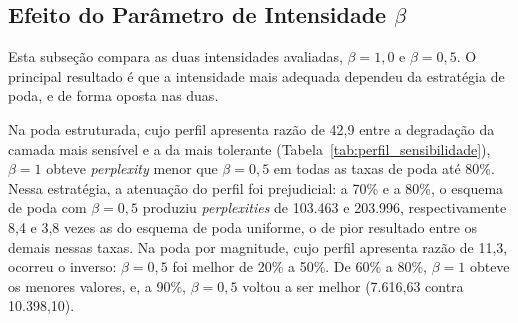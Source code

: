 \subsection{Efeito do Parâmetro de Intensidade $\beta$}\label{subsec:ablacao_beta}

Esta subseção compara as duas intensidades avaliadas, $\beta = 1{,}0$ e $\beta = 0{,}5$.
O principal resultado é que a intensidade mais adequada dependeu da
estratégia de poda, e de forma oposta nas duas.

Na poda estruturada, cujo perfil apresenta razão de 42,9 entre a degradação da camada mais
sensível e a da mais tolerante (Tabela~\ref{tab:perfil_sensibilidade}), $\beta = 1$ obteve
\textit{perplexity} menor que $\beta = 0{,}5$ em todas as taxas de poda até 80\%. Nessa
estratégia, a atenuação do perfil foi prejudicial: a 70\% e a 80\%, o esquema de poda com
$\beta = 0{,}5$ produziu \textit{perplexities} de 103.463 e 203.996, respectivamente 8,4 e 3,8
vezes as do esquema de poda uniforme, o de pior resultado entre os demais nessas taxas. Na poda
por magnitude, cujo perfil apresenta razão de 11,3, ocorreu o inverso: $\beta = 0{,}5$ foi
melhor de 20\% a 50\%. De 60\% a 80\%, $\beta = 1$ obteve os menores valores, e, a 90\%, $\beta
= 0{,}5$ voltou a ser melhor (7.616,63 contra 10.398,10).

